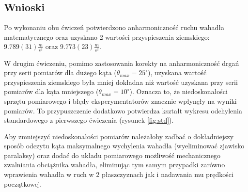 \documentclass[a4paper]{article}
\newlength{\du}
\begin{document}
\subsection{Wnioski}

Po wykonaniu obu ćwiczeń potwierdzono anharmoniczność ruchu wahadła matematycznego oraz uzyskano 2 wartości przyspieszenia ziemskiego: $9.789(31) \tfrac{m}{s^2}$ oraz $9.773(23) \tfrac{m}{s^2}$.

W drugim ćwiczeniu, pomimo zastosowania korekty na anharmoniczność drgań przy serii pomiarów dla dużego kąta ($\theta_{max} = 25^\circ$), uzyskana
wartość przyspieszenia ziemskiego była mniej dokładna niż wartość uzyskana
przy serii pomiarów dla kąta mniejszego ($\theta_{max} = 10^\circ$).
Oznacza to, że niedoskonałości sprzętu pomiarowego i błędy eksperymentatorów
znacznie wpłynęły na wyniki pomiarów.
To przypuszczenie dodatkowo potwierdza kształt wykresu odchylenia standardowego z pierwszego ćwiczenia (rysunek \ref{fig:std}).

Aby zmniejszyć niedoskonałości pomiarów należałoby zadbać o dokładniejszy sposób odczytu
kąta maksymalnego wychylenia wahadła (wyeliminować zjawisko paralaksy) oraz dodać do
układu pomiarowego możliwość mechanicznego zwalniania obciążnika wahadła, eliminując tym
samym przypadki zarówno wprawienia wahadła w ruch w 2 płaszczyznach 
jak i nadawania mu prędkości początkowej.
\end{document}
